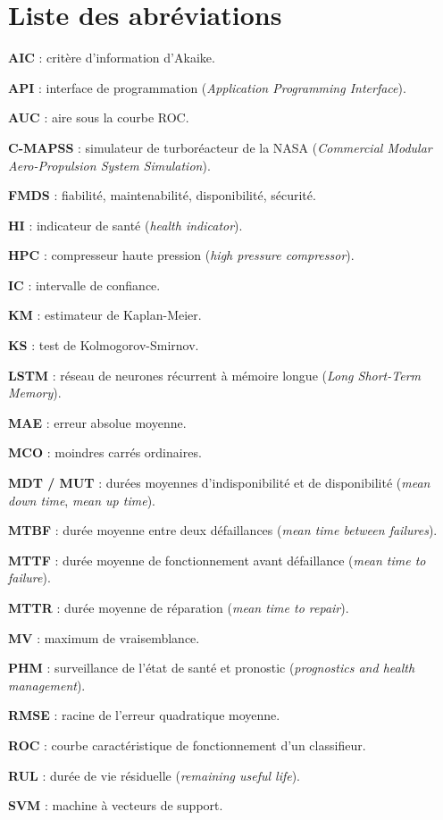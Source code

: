
\tableofcontents

\clearpage{}
\listoffigures

\clearpage{}
\listoftables

\chapter*{Liste des abréviations}

{\small\setlength{\parskip}{3pt}
\textbf{AIC} : critère d'information d'Akaike.

\textbf{API} : interface de programmation (\emph{Application Programming Interface}).

\textbf{AUC} : aire sous la courbe ROC.

\textbf{C-MAPSS} : simulateur de turboréacteur de la NASA (\emph{Commercial Modular Aero-Propulsion System Simulation}).

\textbf{FMDS} : fiabilité, maintenabilité, disponibilité, sécurité.

\textbf{HI} : indicateur de santé (\emph{health indicator}).

\textbf{HPC} : compresseur haute pression (\emph{high pressure compressor}).

\textbf{IC} : intervalle de confiance.

\textbf{KM} : estimateur de Kaplan-Meier.

\textbf{KS} : test de Kolmogorov-Smirnov.

\textbf{LSTM} : réseau de neurones récurrent à mémoire longue (\emph{Long Short-Term Memory}).

\textbf{MAE} : erreur absolue moyenne.

\textbf{MCO} : moindres carrés ordinaires.

\textbf{MDT / MUT} : durées moyennes d'indisponibilité et de disponibilité (\emph{mean down time}, \emph{mean up time}).

\textbf{MTBF} : durée moyenne entre deux défaillances (\emph{mean time between failures}).

\textbf{MTTF} : durée moyenne de fonctionnement avant défaillance (\emph{mean time to failure}).

\textbf{MTTR} : durée moyenne de réparation (\emph{mean time to repair}).

\textbf{MV} : maximum de vraisemblance.

\textbf{PHM} : surveillance de l'état de santé et pronostic (\emph{prognostics and health management}).

\textbf{RMSE} : racine de l'erreur quadratique moyenne.

\textbf{ROC} : courbe caractéristique de fonctionnement d'un classifieur.

\textbf{RUL} : durée de vie résiduelle (\emph{remaining useful life}).

\textbf{SVM} : machine à vecteurs de support.
}
